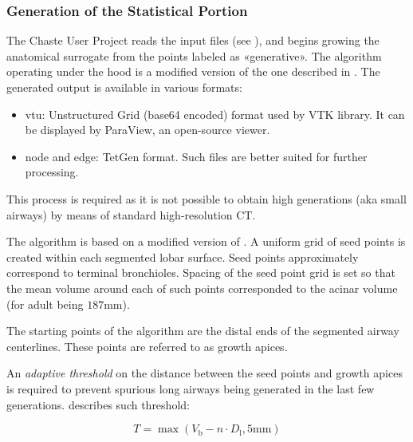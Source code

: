 \subsubsection{Generation of the Statistical Portion}
\label{subsubsec:statistical_generation}

The Chaste User Project reads the input files
(see ), and begins growing the
anatomical surrogate from the points labeled as «generative».  The
algorithm operating under the hood is a modified version of the one
described in \cite{tawhai2000,bordas2015}.  The generated output is
available in various formats:

\begin{itemize}
\item vtu: Unstructured Grid (base64 encoded) format used by VTK
  library.  It can be displayed by ParaView, an open-source viewer.
\item node and edge: TetGen format.  Such files are better suited for
  further processing.
\end{itemize}


This process is required as it is not possible to obtain high
generations (aka small airways) by means of standard high-resolution
CT\cite{bordas2015}.

The algorithm is based on a modified version of \textcite{tawhai2000}.
A uniform grid of seed points is created within each segmented lobar
surface. Seed points approximately correspond to terminal bronchioles.
Spacing of the seed point grid is set so that the mean volume around
each of such points corresponded to the acinar volume (for adult being
$187\text{mm}$).

The starting points of the algorithm are the distal ends of the
segmented airway centerlines.  These points are referred to as growth
apices.

An \emph{adaptive threshold} on the distance between the seed points
and growth apices is required to prevent spurious long airways being
generated in the last few generations.  
describes such threshold:

\begin{equation}
  T = \max(V_{\text{b}} - n\cdot D_{\text{l}}, 5\text{mm})
  \label{eq:airway_threshold}
\end{equation}

